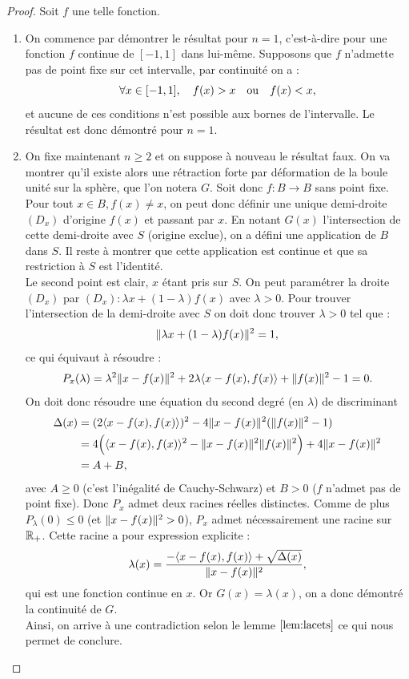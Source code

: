 \begin{proof}
Soit $f$ une telle fonction.

\begin{enumerate}[label=(\roman*)]

\item
On commence par démontrer le résultat pour $n=1$, c'est-à-dire pour une fonction $f$ continue de $[-1, 1]$ dans lui-même.
Supposons que $f$ n'admette pas de point fixe sur cet intervalle, par continuité on a :
\[ \forall x \in [-1, 1], \quad f(x) > x \quad \text{ou} \quad f(x) < x , \]
et aucune de ces conditions n'est possible aux bornes de l'intervalle. Le résultat est donc démontré pour $n=1$.

\item
On fixe maintenant $n \geq 2$ et on suppose à nouveau le résultat faux. 
On va montrer qu'il existe alors une rétraction forte par déformation de la boule unité sur la sphère, que l'on notera $G$.
Soit donc $f : B \to B$ sans point fixe. 
Pour tout $x \in B , f(x) \neq x$, on peut donc définir une unique demi-droite $(D_x)$ d'origine $f(x)$ et passant par $x$.
En notant $G(x)$ l'intersection de cette demi-droite avec $S$ (origine exclue), on a défini une application de $B$ dans $S$. 
Il reste à montrer que cette application est continue et que sa restriction à $S$ est l'identité. \\
Le second point est clair, $x$ étant pris sur $S$.
On peut paramétrer la droite $(D_x)$ par $(D_x) : \lambda x +(1-\lambda) f(x)$ avec $\lambda >0$. 
Pour trouver l'intersection de la demi-droite avec $S$ on doit donc trouver $\lambda > 0$ tel que :
\[ \lVert\lambda x + (1-\lambda)f(x)\rVert^2 = 1 , \]
ce qui équivaut à résoudre :
\[ P_x(\lambda) = \lambda^2 \lVert x-f(x)\rVert^2 + 2 \lambda \langle x - f(x), f(x)\rangle + \lVert f(x)\rVert^2 - 1 = 0 . \]
On doit donc résoudre une équation du second degré (en $\lambda$) de discriminant 
\begin{align*}
\Delta(x) & = (2\langle x - f(x), f(x)\rangle)^2 - 4  \lVert x-f(x)\rVert^2 (\lVert f(x)\rVert^2 - 1) \\
& = 4 \Bigl(  \langle x - f(x), f(x)\rangle^2 - \lVert x-f(x)\rVert^2 \lVert f(x)\rVert^2  \Bigr) + 4 \lVert x-f(x)\rVert^2 \\
& = A + B ,
\end{align*}
avec $A \geq 0$ (c'est l'inégalité de Cauchy-Schwarz) et $B > 0$ ($f$ n'admet pas de point fixe). 
Donc $P_x$ admet deux racines réelles distinctes. 
Comme de plus $P_\lambda(0) \leq 0$ (et $\lVert x-f(x)\rVert^2 > 0$),  $P_x$ admet nécessairement une racine sur $\mathbb{R}_+$. 
Cette racine a pour expression explicite :
\[ \lambda(x) = \dfrac{ - \langle x - f(x), f(x)\rangle + \sqrt{\Delta(x)} }{ \lVert x-f(x)\rVert^2 } , \]
qui est une fonction continue en $x$. Or $G(x) = \lambda(x)$, on a donc démontré la continuité de $G$. \\
Ainsi, on arrive à une contradiction selon le lemme $\ref{lem:lacets}$ ce qui nous permet de conclure.
\end{enumerate}

\end{proof}

